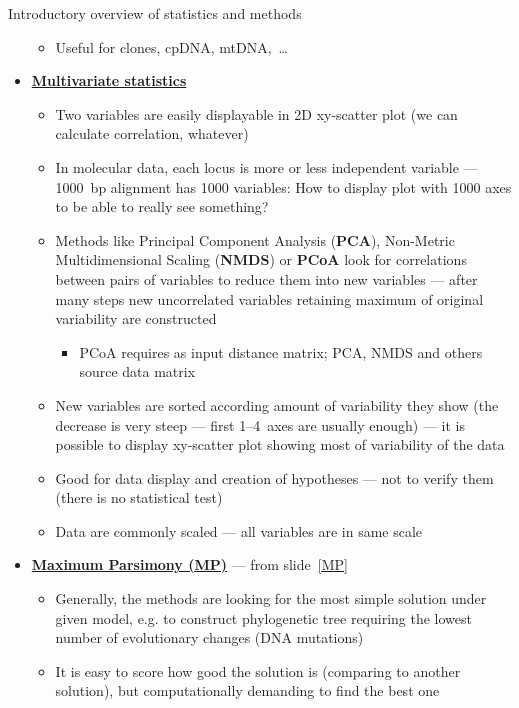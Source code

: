 \documentclass[compress, xelatex, 11pt, xcolor=svgnames, aspectratio=169,
	hyperref={
		bookmarks=true,
		unicode=true,
		colorlinks=true,
		pdftitle={Molecular data in R},
		plainpages=false,
		pdfauthor={Vojtech Zeisek},
		pdfsubject={Course about phylogeny and evolution in R},
		pdfcreator={XeLaTeX},
		pdfkeywords={R, evolution, phylogeny, molecular data},
		linkcolor=Crimson, %
		anchorcolor=Magenta, %
		citecolor=Magenta, %
		filecolor=Magenta, %
		menucolor=Magenta, %
		urlcolor=DodgerBlue, %
		},
	url={hyphens, lowtilde} %
	]{beamer}
\begin{document}
\begin{frame}[allowframebreaks]{Introductory overview of statistics and methods}
\begin{itemize}
\begin{itemize}
			\item Useful for clones, cpDNA, mtDNA,~\ldots
			\end{itemize}
		\item \textbf{\href{https://en.wikipedia.org/wiki/Multivariate_statistics}{Multivariate statistics}}
		\begin{itemize}
			\item Two variables are easily displayable in 2D xy-scatter plot (we can calculate correlation, whatever)
			\item In molecular data, each locus is more or less independent variable --- 1000~bp alignment has 1000 variables: How to display plot with 1000 axes to be able to really see something?
			\item Methods like Principal Component Analysis (\textbf{PCA}), Non-Metric Multidimensional Scaling (\textbf{NMDS}) or \textbf{PCoA} look for correlations between pairs of variables to reduce them into new variables --- after many steps new uncorrelated variables retaining maximum of original variability are constructed
			\begin{itemize}
				\item PCoA requires as input distance matrix; PCA, NMDS and others source data matrix
			\end{itemize}
			\item New variables are sorted according amount of variability they show (the decrease is very steep --- first 1--4~axes are usually enough) --- it is possible to display xy-scatter plot showing most of variability of the data
			\item Good for data display and creation of hypotheses --- not to verify them (there is no statistical test)
			\item Data are commonly scaled --- all variables are in same scale
		\end{itemize}
		\item \textbf{\href{https://en.wikipedia.org/wiki/Maximum_parsimony_(phylogenetics)}{Maximum Parsimony (MP)}} --- from slide~\ref{MP}
		\begin{itemize}
			\item Generally, the methods are looking for the most simple solution under given model, e.g. to construct phylogenetic tree requiring the lowest number of evolutionary changes (DNA mutations)
			\item It is easy to score how good the solution is (comparing to another solution), but computationally demanding to find the best one
		\end{itemize}

\end{itemize}
\end{frame}
\end{document}
